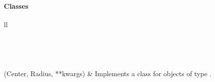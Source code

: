 \documentclass[letterpaper,10pt,english]{sphinxmanual}
\begin{document}
\paragraph{Classes}
\label{Chapters/PythonModuleReference/Patterns/TXLWizard.Patterns.Circle:classes}
\begin{longtable}{ll}
\hline
\endfirsthead

%
{{}} \\
\hline
\endhead

\hline {} \\ \hline
\endfoot

\endlastfoot


{\hyperref[Chapters/PythonModuleReference/Patterns/TXLWizard.Patterns.Circle:TXLWizard.Patterns.Circle.Circle]{}}(Center, Radius, **kwargs)
 & 
Implements a class for  objects of type .
\\
\hline\end{longtable}

\end{document}
